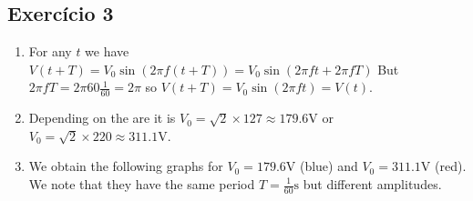 \begin{enumerate}
\begin{center}
  \end{center}

\end{enumerate}

\subsection*{Exercício 3}

\begin{enumerate}
\item For any $t$ we have
  $V(t+T) = V_0 \sin\left(2 \pi f {(t+T)}\right) =
  V_0 \sin\left(2 \pi f t + {2 \pi f T}\right)$ But
  $2 \pi f T = 2 \pi 60 \frac{1}{60} = 2 \pi$ so
  $V(t+T) = V_0 \sin\left(2 \pi f t\right) = V(t)$.

\item Depending on the are it is
  $V_0 = \sqrt{2} \times 127 \approx 179.6 \text{V}$
  or
  $V_0 = \sqrt{2} \times 220 \approx 311.1 \text{V}$.
\item We obtain the following graphs for $V_0 = 179.6 \text{V}$ (blue)
  and $V_0 = 311.1 \text{V}$ (red). We note that they have the same period
  $T = \frac{1}{60} \text{s}$ but different amplitudes.


\end{enumerate}

